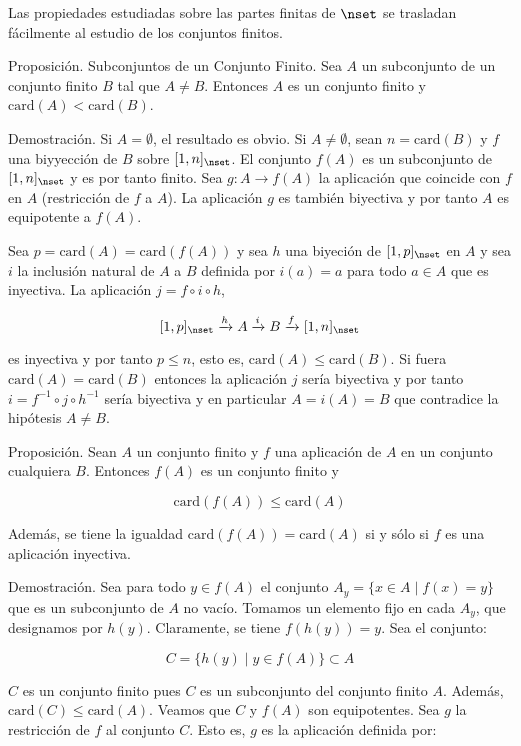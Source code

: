 Las propiedades estudiadas sobre las partes finitas de $\nset$ se trasladan
fácilmente al estudio de los conjuntos finitos.

Proposición. Subconjuntos de un Conjunto Finito. Sea $A$ un subconjunto de
un conjunto finito $B$ tal que $A \neq B$. Entonces $A$ es un conjunto
finito y $\text{card}(A) < \text{card}(B)$.

Demostración. Si $A = \emptyset$, el resultado es obvio. Si $A \neq
\emptyset$, sean $n = \text{card}(B)$ y $f$ una biyyección de $B$ sobre
$[1, n]_{\nset}$. El conjunto $f(A)$ es un subconjunto de $[1, n]_{\nset}$ y
es por tanto finito. Sea $g: A \longrightarrow f(A)$ la aplicación que
coincide con $f$ en $A$ (restricción de $f$ a $A$). La aplicación $g$ es
también biyectiva y por tanto $A$ es equipotente a $f(A)$. 

Sea $p = \text{card}(A) = \text{card}(f(A))$ y sea $h$ una biyeción de $[1,
p]_{\nset}$ en $A$ y sea $i$ la inclusión natural de $A$ a $B$ definida por
$i(a) = a$ para todo $a \in A$ que es inyectiva. La aplicación $j = f \circ
i \circ h$,

$$ [1, p]_{\nset} \xrightarrow{h} A \xrightarrow{i} B \xrightarrow{f} [1,
n]_{\nset} $$

\noindent es inyectiva y por tanto $p \leq n$, esto es, $\text{card}(A) \leq
\text{card}(B)$. Si fuera $\text{card}(A) = \text{card}(B)$ entonces la
aplicación $j$ sería biyectiva y por tanto $i = f^{-1} \circ j \circ h^{-1}$
sería biyectiva y en particular $A = i(A) = B$ que contradice la hipótesis
$A \neq B$.

Proposición. Sean $A$ un conjunto finito y $f$ una aplicación de $A$ en un
conjunto cualquiera $B$. Entonces $f(A)$ es un conjunto finito y

$$ \text{card}(f(A)) \leq \text{card}(A) $$

Además, se tiene la igualdad $\text{card}(f(A)) = \text{card}(A)$ si y sólo
si $f$ es una aplicación inyectiva.

Demostración. Sea para todo $y \in f(A)$ el conjunto $A_y = \{x \in A \mid
f(x) = y\}$ que es un subconjunto de $A$ no vacío. Tomamos un elemento fijo
en cada $A_y$, que designamos por $h(y)$. Claramente, se tiene $f(h(y)) =
y$. Sea el conjunto:

$$ C = \{h(y) \mid y \in f(A)\} \subset A $$

$C$ es un conjunto finito pues $C$ es un subconjunto del conjunto finito
$A$. Además, $\text{card}(C) \leq \text{card}(A)$. Veamos que $C$ y $f(A)$
son equipotentes. Sea $g$ la restricción de $f$ al conjunto $C$. Esto es,
$g$ es la aplicación definida por:

